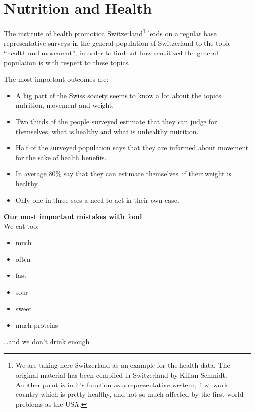 \documentclass[../main.tex]{subfiles}
\begin{document}
\section{Nutrition and Health}

The institute of health promotion Switzerland\footnote{We are taking here Switzerland as an example for the health data.
  The original material has been compiled in Switzerland by Kilian Schmidt.
  Another point is in it's function as a representative western, first world country
  which is pretty healthy, and not so much affected by the first world problems as the USA.} leads on a regular base representative surveys
in the general population of Switzerland to the topic ``health and movement'',
in order to find out how sensitized the general population is with respect to these topics.

The most important outcomes are:
\begin{itemize}
\item A big part of the Swiss society seems to know a lot about the topics nutrition, movement and weight.
\item Two thirds of the people surveyed estimate that they can judge for themselves, what is healthy and what is unhealthy nutrition.
\item Half of the surveyed population says that they are informed about movement for the sake of health benefits.
\item In average 80\% say that they can estimate themselves, if their weight is healthy.
\item Only one in three sees a need to act in their own case.
\end{itemize}


\begin{center}
  \begin{fminipage}{4.5cm}
    \textbf{Our most important mistakes with food} \\
    We eat too:
    \begin{itemize}
      \setlength\itemsep{0em}
    \item much
    \item often
    \item fast
    \item sour
    \item sweet
    \item much proteins
    \end{itemize}
    \vspace{2mm}
    \ldots and we don't drink enough
 \end{fminipage}
 \end{center}
\end{document}

